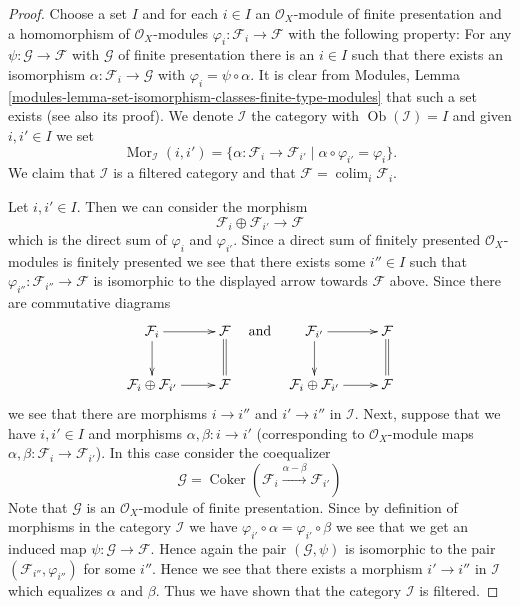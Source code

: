 \documentclass[10pt,a4paper]{amsart}
\theoremstyle{plain}
\theoremstyle{definition}
\theoremstyle{remark}
\numberwithin{equation}{subsection}
\def\colim{\mathop{\mathrm{colim}}\nolimits}
\def\Mor{\mathop{\mathrm{Mor}}\nolimits}
\def\Ob{\mathop{\mathrm{Ob}}\nolimits}
\def\Coker{\mathop{\mathrm{Coker}}}
\begin{document}
\begin{proof}
Choose a set $I$ and for each $i \in I$ an $\mathcal{O}_X$-module
of finite presentation and a homomorphism of $\mathcal{O}_X$-modules
$\varphi_i : \mathcal{F}_i \to \mathcal{F}$ with the following
property: For any $\psi : \mathcal{G} \to \mathcal{F}$ with $\mathcal{G}$
of finite presentation there is an $i \in I$ such that there exists
an isomorphism $\alpha : \mathcal{F}_i \to \mathcal{G}$ with
$\varphi_i = \psi \circ \alpha$. It is clear from
Modules, Lemma \ref{modules-lemma-set-isomorphism-classes-finite-type-modules}
that such a set exists (see also its proof).
We denote $\mathcal{I}$ the category
with $\Ob(\mathcal{I}) = I$ and given $i, i' \in I$
we set
$$
\Mor_\mathcal{I}(i, i') =
\{\alpha : \mathcal{F}_i \to \mathcal{F}_{i'} \mid
\alpha \circ \varphi_{i'} = \varphi_i
\}.
$$
We claim that $\mathcal{I}$ is a filtered category and that
$\mathcal{F} = \colim_i \mathcal{F}_i$.

\medskip\noindent
Let $i, i' \in I$. Then we can consider the morphism
$$
\mathcal{F}_i \oplus \mathcal{F}_{i'} \longrightarrow \mathcal{F}
$$
which is the direct sum of $\varphi_i$ and $\varphi_{i'}$.
Since a direct sum of finitely presented $\mathcal{O}_X$-modules
is finitely presented we see that there exists some $i'' \in I$
such that $\varphi_{i''} : \mathcal{F}_{i''} \to \mathcal{F}$
is isomorphic to the displayed arrow towards $\mathcal{F}$ above.
Since there are commutative diagrams
$$
\xymatrix{
\mathcal{F}_i \ar[r] \ar[d] & \mathcal{F} \ar@{=}[d] \\
\mathcal{F}_i \oplus \mathcal{F}_{i'} \ar[r] & \mathcal{F}
}
\quad
\text{and}
\quad
\xymatrix{
\mathcal{F}_{i'} \ar[r] \ar[d] & \mathcal{F} \ar@{=}[d] \\
\mathcal{F}_i \oplus \mathcal{F}_{i'} \ar[r] & \mathcal{F}
}
$$
we see that there are morphisms $i \to i''$ and $i' \to i''$
in $\mathcal{I}$. Next, suppose that we have $i, i' \in I$ and
morphisms $\alpha, \beta : i \to i'$ (corresponding to $\mathcal{O}_X$-module
maps $\alpha, \beta : \mathcal{F}_i \to \mathcal{F}_{i'}$).
In this case consider the coequalizer
$$
\mathcal{G} =
\Coker(
\mathcal{F}_i \xrightarrow{\alpha - \beta} \mathcal{F}_{i'}
)
$$
Note that $\mathcal{G}$ is an $\mathcal{O}_X$-module of finite presentation.
Since by definition of morphisms in the category $\mathcal{I}$
we have $\varphi_{i'} \circ \alpha = \varphi_{i'} \circ \beta$
we see that we get an induced map $\psi : \mathcal{G} \to \mathcal{F}$.
Hence again the pair $(\mathcal{G}, \psi)$ is isomorphic to
the pair $(\mathcal{F}_{i''}, \varphi_{i''})$ for some $i''$.
Hence we see that there exists a morphism $i' \to i''$ in
$\mathcal{I}$ which equalizes $\alpha$ and $\beta$. Thus we have
shown that the category $\mathcal{I}$ is filtered.


\end{proof}
\end{document}
